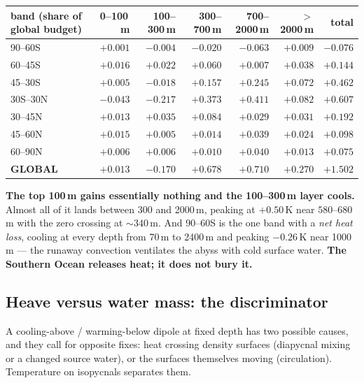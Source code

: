 \documentclass[10pt]{article}
\begin{document}
\begin{center}\small
\begin{tabular}{lrrrrrr}
\toprule
band (share of global budget) & 0--100\,m & 100--300\,m & 300--700\,m & 700--2000\,m & $>$2000\,m & total \\
\midrule
90--60S  & $+0.001$ & $-0.004$ & $-0.020$ & $-0.063$ & $+0.009$ & $\mathbf{-0.076}$ \\
60--45S  & $+0.016$ & $+0.022$ & $+0.060$ & $+0.007$ & $+0.038$ & $+0.144$ \\
45--30S  & $+0.005$ & $-0.018$ & $+0.157$ & $+0.245$ & $+0.072$ & $+0.462$ \\
30S--30N & $-0.043$ & $-0.217$ & $+0.373$ & $+0.411$ & $+0.082$ & $\mathbf{+0.607}$ \\
30--45N  & $+0.013$ & $+0.035$ & $+0.084$ & $+0.029$ & $+0.031$ & $+0.192$ \\
45--60N  & $+0.015$ & $+0.005$ & $+0.014$ & $+0.039$ & $+0.024$ & $+0.098$ \\
60--90N  & $+0.006$ & $+0.006$ & $+0.010$ & $+0.040$ & $+0.013$ & $+0.075$ \\
\midrule
\textbf{GLOBAL} & $\mathbf{+0.013}$ & $\mathbf{-0.170}$ & $\mathbf{+0.678}$ & $\mathbf{+0.710}$ & $+0.270$ & $\mathbf{+1.502}$ \\
\bottomrule
\end{tabular}
\end{center}

\textbf{The top 100\,m gains essentially nothing and the 100--300\,m layer cools.} Almost all
of it lands between 300 and 2000\,m, peaking at $+0.50$\,K near $580$--$680$\,m with the zero
crossing at ${\sim}340$\,m. And 90--60S is the one band with a \emph{net heat loss}, cooling
at every depth from 70\,m to 2400\,m and peaking $-0.26$\,K near 1000\,m --- the runaway
convection ventilates the abyss with cold surface water. \textbf{The Southern Ocean releases
heat; it does not bury it.}

\subsection{Heave versus water mass: the discriminator}\label{sub:r35heave}
A cooling-above / warming-below dipole at fixed depth has two possible causes, and they call
for opposite fixes: heat crossing density surfaces (diapycnal mixing or a changed source
water), or the surfaces themselves moving (circulation). Temperature on isopycnals separates
them.
\end{document}

